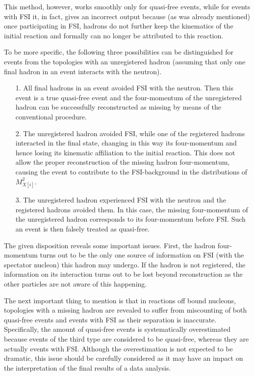 This method, however, works smoothly only for quasi-free events, while for events with FSI it, in fact, gives an incorrect output because (as was already mentioned) once participating in FSI, hadrons do not further keep the kinematics of the initial reaction and formally can no longer be attributed to this reaction. %


To be more specific, the following three possibilities can be distinguished for events from the topologies with an unregistered hadron (assuming that  only one final hadron in an event interacts with the neutron).


\begin{itemize}
\item[1.] All final hadrons in an event avoided FSI with the neutron. Then this event is a true quasi-free event and the four-momentum of the unregistered hadron can be successfully reconstructed as missing by means of the conventional procedure.
\item[2.] The unregistered hadron avoided FSI, while one of the registered hadrons interacted in the final state, changing in this way its four-momentum and hence losing its kinematic affiliation to the initial reaction. This does not allow the proper reconstruction of the missing hadron four-momentum, causing the event to contribute to the FSI-background in the distributions of $M^{2}_{X[i]}$.
\item[3.] The unregistered hadron experienced FSI with the neutron and the registered hadrons avoided them. In this case, the missing four-momentum of the unregistered hadron corresponds to its four-momentum before FSI. Such an event is then falsely treated as quasi-free.
\end{itemize}


The given disposition reveals some important issues. First, the hadron four-momentum turns out to be the only one source of information on FSI (with the spectator nucleon) this hadron may undergo. If the hadron is not registered, the information on its interaction turns out to be lost beyond reconstruction as the other particles are not aware of this happening.

The next important thing to mention is that in reactions off bound nucleons, topologies with a missing hadron are revealed to suffer from miscounting of both quasi-free events and events with FSI as their separation is inaccurate. Specifically, the amount of quasi-free events is systematically overestimated because events of the third type are considered to be quasi-free, whereas they are actually events with FSI. Although the overestimation is not expected to be dramatic, this issue should be carefully considered as it may have an impact on the interpretation of the final results of a data analysis.

